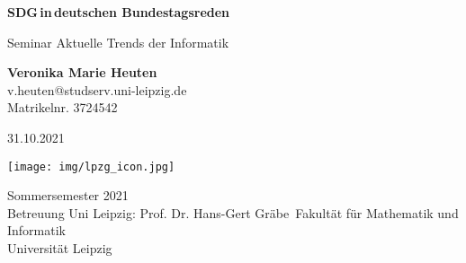 \documentclass[letterpaper]{article}
\begin{document}
\begin{titlepage}
    \begin{center}
        \vspace*{2cm}
            
        \LARGE
        \textbf{SDG\,in\,deutschen Bundestagsreden\,}\\
            
        \vspace{0.5cm}
        \large
        Seminar Aktuelle Trends der Informatik 
            
        \vspace{3.0cm}
        
        \normalsize{\textbf{Veronika Marie Heuten}}\\
        \normalsize{v.heuten@studserv.uni-leipzig.de}\\
        \normalsize{Matrikelnr. 3724542}\\
            
           \vspace{3cm}


        31.10.2021
        
        \vspace{0.8cm}
            
        \texttt{[image: img/lpzg\_icon.jpg]}
          
        \vspace{0.8cm}
        
        \normalsize
        Sommersemester 2021\\
        \vspace{0.8cm}
        \small Betreuung Uni Leipzig: Prof. Dr. Hans-Gert Gräbe\
        \small Fakultät für Mathematik und Informatik\\
        \small Universität Leipzig\\
            
    \end{center}
\end{titlepage}


\clearpage 
\tableofcontents
\clearpage
\end{document}
